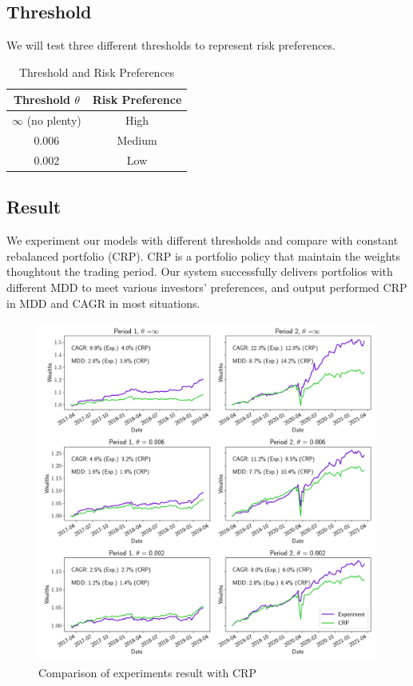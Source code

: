 \subsection{Threshold}
We will test three different thresholds to represent risk preferences.  
\begin{table}[htb]
    \centering
    \begin{tabular}{|c|c|}
    \hline \hline
    Threshold $\theta$ & Risk Preference \\ \hline
    $\infty$  (no plenty) & High \\ \hline
    0.006 & Medium      \\ \hline
    0.002 & Low      \\ \hline    
    \hline
    \end{tabular}
    \caption{Threshold and Risk Preferences}
    \label{tab:threshold}
\end{table}
\subsection{Result}
We experiment our models with different thresholds and compare with constant rebalanced portfolio (CRP). 
CRP is a portfolio policy that maintain the weights thoughtout the trading period. 
Our system successfully delivers portfolios with different MDD to meet various investors' preferences, and output performed CRP in MDD and CAGR in most situations.

\begin{figure}[htb]
\centering
  \includegraphics[width=16cm]{images/crp_compare.png}
  \caption [Comparison of experiments result with CRP]{Comparison of experiments result with CRP}
  \label{fig:crp_compare}
\end{figure}